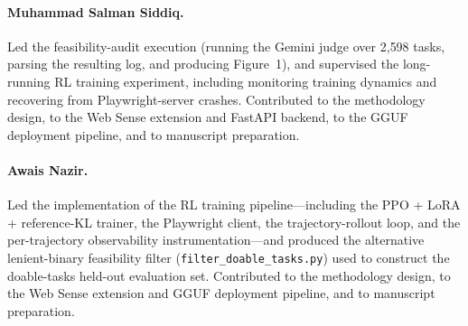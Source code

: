 \documentclass[12pt,a4paper]{report}
\begin{document}
\paragraph{Muhammad Salman Siddiq.} Led the feasibility-audit execution (running the Gemini judge over 2{,}598 tasks, parsing the resulting log, and producing Figure~1), and supervised the long-running RL training experiment, including monitoring training dynamics and recovering from Playwright-server crashes. Contributed to the methodology design, to the Web Sense extension and FastAPI backend, to the GGUF deployment pipeline, and to manuscript preparation.

\paragraph{Awais Nazir.} Led the implementation of the RL training pipeline---including the PPO + LoRA + reference-KL trainer, the Playwright client, the trajectory-rollout loop, and the per-trajectory observability instrumentation---and produced the alternative lenient-binary feasibility filter (\texttt{filter\_doable\_tasks.py}) used to construct the doable-tasks held-out evaluation set. Contributed to the methodology design, to the Web Sense extension and GGUF deployment pipeline, and to manuscript preparation.
\end{document}
